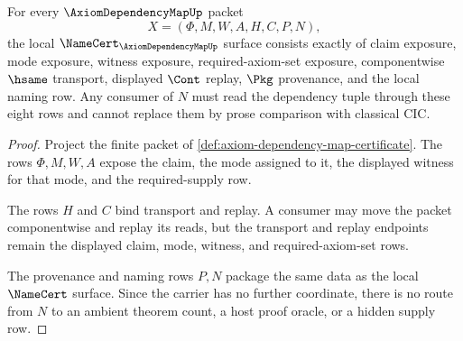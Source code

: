 \begin{theorem}
\label{thm:axiom-dependency-map-ledger-obligations}
For every $\AxiomDependencyMapUp$ packet
$$
X=(\Phi,M,W,A,H,C,P,N),
$$
the local $\NameCert_{\AxiomDependencyMapUp}$ surface consists exactly of claim exposure, mode exposure, witness exposure, required-axiom-set exposure, componentwise $\hsame$ transport, displayed $\Cont$ replay, $\Pkg$ provenance, and the local naming row. Any consumer of $N$ must read the dependency tuple through these eight rows and cannot replace them by prose comparison with classical CIC.
\end{theorem}
\begin{proof}
Project the finite packet of \autoref{def:axiom-dependency-map-certificate}. The rows $\Phi,M,W,A$ expose the claim, the mode assigned to it, the displayed witness for that mode, and the required-supply row.

The rows $H$ and $C$ bind transport and replay. A consumer may move the packet componentwise and replay its reads, but the transport and replay endpoints remain the displayed claim, mode, witness, and required-axiom-set rows.

The provenance and naming rows $P,N$ package the same data as the local $\NameCert$ surface. Since the carrier has no further coordinate, there is no route from $N$ to an ambient theorem count, a host proof oracle, or a hidden supply row.
\end{proof}

